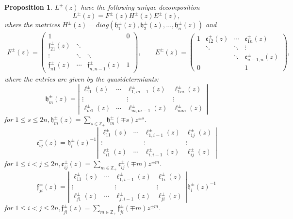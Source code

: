\documentclass[10pt,a4paper]{amsart}
\newtheorem{proposition}[theorem]{Proposition}
\numberwithin{equation}{section}
\begin{document}
	 	\begin{proposition}\cite{JLM2}
	 		$L^{ \pm}(z)$ have the following unique decomposition
	 		$$
	 		L^{ \pm}(z)=F^{ \pm}(z) H^{ \pm}(z) E^{ \pm}(z),
	 		$$
	 where the matrices ${H}^{ \pm}(z)=diag(\mathfrak{h}_1^{ \pm}(z), \mathfrak{h}_2^{ \pm}(z), \ldots, \mathfrak{h}_n^{ \pm}(z))$ and		
\begin{align*}
	 		F^{ \pm}(z)=\left(\begin{array}{cccc}
	 			1 & & & 0 \\
	 			\mathfrak{f}_{21}^{ \pm}(z) & \ddots & & \\
	 			\vdots & \ddots & \ddots & \\
	 			\mathfrak{f}_{n 1}^{ \pm}(z) & \cdots & 	\mathfrak{f}_{n, n-1}^{ \pm}(z) & 1
	 		\end{array}\right), \qquad
	 		E^{ \pm}(z)=\left(\begin{array}{cccc}
	 			1 & 	\mathfrak{e}_{12}^{ \pm}(z) & \cdots & 	\mathfrak{e}_{1 n}^{ \pm}(z) \\
	 			& \ddots & \ddots & \vdots \\
	 			& & \ddots & 	\mathfrak{e}_{n-1, n}^{ \pm}(z) \\
	 			0 & & & 1
	 		\end{array}\right),
\end{align*}
	 		where the entries are given by the quasidetermiants:
	 		$$
	 		\mathfrak{h}_m^{ \pm}(z)=\left|\begin{array}{cccc}
	 			\ell_{11}^{ \pm}(z) & \cdots & \ell_{1, m-1}^{ \pm}(z) & \ell_{1 m}^{ \pm}(z) \\
	 			\vdots & & \vdots & \vdots \\
	 			\ell_{m 1}^{ \pm}(z) & \cdots & \ell_{m, m-1}^{ \pm}(z) & \boxed{\ell_{m m}^{ \pm}(z)}
	 		\end{array}\right|
	 		$$
	 		for $1 \leq s \leq 2 n, \mathfrak{h}_m^{ \pm}(z)=\sum_{s \in \mathbb{Z}_{+}} \mathfrak{h}_m^{ \pm}(\mp s) z^{ \pm s}$.
	 		$$
	 		\mathfrak{e}_{i j}^{ \pm}(z)=\mathfrak{h}_i^{ \pm}(z)^{-1}\left|\begin{array}{cccc}
	 			\ell_{11}^{ \pm}(z) & \cdots & \ell_{1, i-1}^{ \pm}(z) & \ell_{1 j}^{ \pm}(z) \\
	 			\vdots & & \vdots & \vdots \\
	 			\ell_{i 1}^{ \pm}(z) & \cdots & \ell_{i, i-1}^{ \pm}(z) & \boxed{\ell_{i j}^{ \pm}(z)}
	 		\end{array}\right|
	 		$$
	 		for $1 \leq i<j \leq 2 n, 	\mathfrak{e}_{i j}^{ \pm}(z)=\sum_{m \in \mathbb{Z}_{+}} 	\mathfrak{e}_{i j}^{ \pm}(\mp m) z^{ \pm m}$.
	 		$$
	 		\mathfrak{f}_{j i}^{ \pm}(z)=\left|\begin{array}{cccc}
	 			\ell_{11}^{ \pm}(z) & \cdots & \ell_{1, i-1}^{ \pm}(z) & \ell_{1 i}^{ \pm}(z) \\
	 			\vdots & & \vdots & \vdots \\
	 			\ell_{j 1}^{ \pm}(z) & \cdots & \ell_{j, i-1}^{ \pm}(z) & \boxed{\ell_{j i}^{ \pm}(z)}
	 		\end{array}\right| 	\mathfrak{h}_i^{ \pm}(z)^{-1}
	 		$$
	 		for $1 \leq i<j \leq 2 n, 	\mathfrak{f}_{j i}^{ \pm}(z)=\sum_{m \in \mathbb{Z}_{+}} 	\mathfrak{f}_{j i}^{ \pm}(\mp m) z^{ \pm m}$.
 		\end{proposition}
	 		
\end{document}
